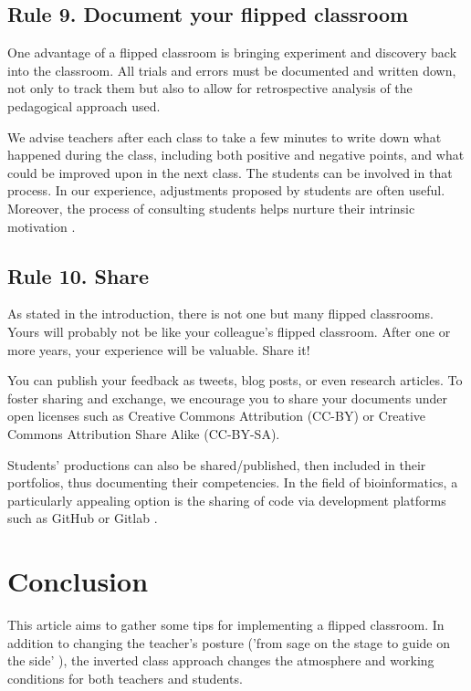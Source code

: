 \documentclass[10pt,letterpaper]{article}
\begin{document}
\subsection{Rule 9. Document your flipped classroom}

One advantage of a flipped classroom is bringing experiment and discovery back into the classroom. All trials and errors 
must be documented and written down, not only to track them but also to allow for retrospective analysis of the pedagogical approach used.

We advise teachers after each class to take a few minutes to write down what happened during the class, including both positive and negative points, 
and what could be improved upon in the next class. The students can be involved in that process. 
In our experience, adjustments proposed by students are often useful. Moreover, the process of consulting students helps nurture their intrinsic motivation \cite{oraif_university_2018,thai_impact_2017}.


\subsection{Rule 10. Share}

As stated in the introduction, there is not one but many flipped classrooms. Yours will probably not be like your colleague's flipped
classroom. After one or more years, your experience will be valuable. Share it!

You can publish your feedback as tweets, blog posts, or even research articles. To foster sharing and exchange, 
we encourage you to share your documents under open licenses such as Creative Commons Attribution (CC-BY) or Creative Commons Attribution Share Alike (CC-BY-SA).

Students’ productions can also be shared/published, then included in their portfolios, thus documenting their competencies. 
In the field of bioinformatics, a particularly appealing option is the sharing of code via development platforms such as GitHub or Gitlab \cite{blischak_quick_2016,abdollahi2018meet}.


\section*{Conclusion}

This article aims to gather some tips for implementing a flipped classroom. In addition to changing 
the teacher's posture ('from sage on the stage to guide on the side' \cite{king_sage_1993}), 
the inverted class approach changes the atmosphere and working conditions for both teachers 
and students.
\end{document}
